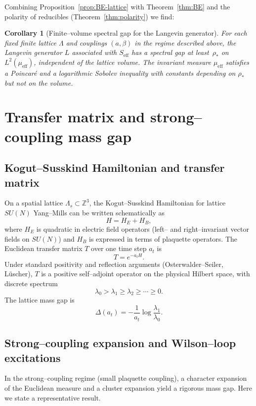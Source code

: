 \documentclass[11pt]{article}
\numberwithin{equation}{section}
\newtheorem{corollary}[theorem]{Corollary}
\begin{document}
Combining Proposition~\ref{prop:BE-lattice} with
Theorem~\ref{thm:BE} and the polarity of reducibles
(Theorem~\ref{thm:polarity}) we find:

\begin{corollary}[Finite--volume spectral gap for the Langevin generator]
\label{cor:Langevin-gap}
For each fixed finite lattice $\Lambda$ and couplings $(a,\beta)$ in the
regime described above, the Langevin generator $L$ associated with
$S_{\mathrm{eff}}$ has a spectral gap at least~$\rho_*$ on
$L^2(\mu_{\mathrm{eff}})$, independent of the lattice volume.  The
invariant measure $\mu_{\mathrm{eff}}$ satisfies a Poincar\'e and a
logarithmic Sobolev inequality with constants depending on
$\rho_*$ but not on the volume.
\end{corollary}

\section{Transfer matrix and strong--coupling mass gap}

\subsection{Kogut--Susskind Hamiltonian and transfer matrix}

On a spatial lattice $\Lambda_s\subset\mathbb{Z}^3$, the Kogut--Susskind
Hamiltonian for lattice $SU(N)$ Yang--Mills can be written schematically
as
\[
  H = H_E + H_B,
\]
where $H_E$ is quadratic in electric field operators (left-- and
right--invariant vector fields on $SU(N)$) and $H_B$ is expressed in
terms of plaquette operators.  The Euclidean transfer matrix $T$ over
one time step $a_t$ is
\[
  T = e^{-a_t H}.
\]
Under standard positivity and reflection arguments (Osterwalder--Seiler,
L\"uscher), $T$ is a positive self--adjoint operator on the physical
Hilbert space, with discrete spectrum
\[
  \lambda_0 > \lambda_1 \ge \lambda_2 \ge \cdots \ge 0.
\]
The lattice mass gap is
\[
  \Delta(a_t) = -\frac{1}{a_t}\log\frac{\lambda_1}{\lambda_0}.
\]

\subsection{Strong--coupling expansion and Wilson--loop excitations}

In the strong--coupling regime (small plaquette coupling), a character
expansion of the Euclidean measure and a cluster expansion yield a
rigorous mass gap.  Here we state a representative result.
\end{document}

